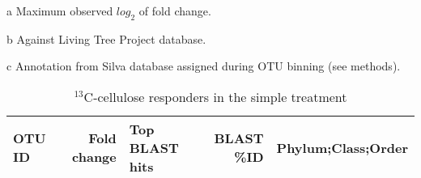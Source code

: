 \documentclass[10pt]{article}
\begin{document}
\setcounter{table}{1}
\setcounter{section}{3}

\pagestyle{empty}

\begin{ThreePartTable}
\begin{TableNotes}
\item[a] Maximum observed $log_{2}$ of fold change. 
\item[b] Against Living Tree Project database.
\item[c] Annotation from Silva database assigned during OTU binning (see methods).
\end{TableNotes}

\begin{longtable}{lrP{5cm}rP{7cm}}

\caption{$^{13}$C-cellulose responders in the simple treatment} \\
\toprule 
    \textbf{OTU ID} & 
    \textbf{Fold change}  &  
    \textbf{Top BLAST hits} & 
    \textbf{BLAST \%ID} & 
    \textbf{Phylum;Class;Order} \\
\midrule
\endfirsthead


\end{longtable}
\end{ThreePartTable}
\end{document}
